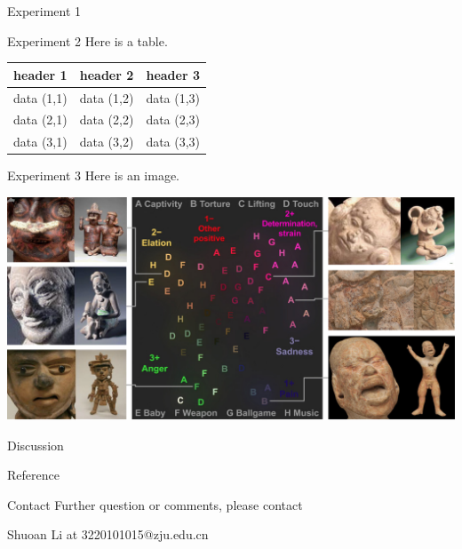 \documentclass[a0paper,portrait]{xebaposter}
\begin{document}
\begin{poster}
  \begin{posterbox}[name=exp1,column=0,below=introduction]{Experiment 1}
    \lipsum[5]
  \end{posterbox}

  \begin{posterbox}[name=exp2,column=1,below=introduction]{Experiment 2}
    Here is a table.
    
    \vspace{.01\textheight}
    \begin{center}
    \begin{tabular}{c c c}
      \toprule
      header 1 & header 2 & header 3\\
      \midrule
      data (1,1) & data (1,2) & data (1,3)\\
      data (2,1) & data (2,2) & data (2,3)\\
      data (3,1) & data (3,2) & data (3,3)\\
      \bottomrule
    \end{tabular}
    \end{center}
  \end{posterbox}

  \begin{posterbox}[name=exp3,column=0,below=exp1,above=bottom]{Experiment 3}
    Here is an image.
    
    \begin{center}
      \includegraphics[width=\textwidth]{abb1005-f4.jpeg}
    \end{center}
  \end{posterbox}

  \begin{posterbox}[name=discussion,column=1,below=exp2]{Discussion}
    \lipsum[8]
  \end{posterbox}

  \begin{posterbox}[name=reference,column=1,below=discussion]{Reference}
    \printbibliography[heading=none]
  \end{posterbox}

  \begin{posterbox}[name=contact,column=1,below=reference,above=bottom]{Contact}
    Further question or comments, please contact

    Shuoan Li at 3220101015@zju.edu.cn
  \end{posterbox}

\end{poster}
\end{document}
